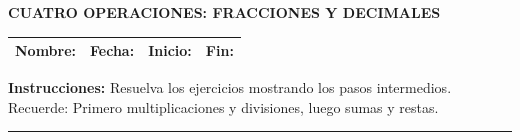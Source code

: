 \documentclass[11pt, letterpaper]{article}
\begin{document}
\begin{center}
	\textbf{\Large CUATRO OPERACIONES: FRACCIONES Y DECIMALES} \\
	\vspace{0.4cm}
	\begin{tabular}{|p{5cm}|p{3.5cm}|p{3cm}|p{3cm}|}
		\hline
		Nombre: & Fecha: & Inicio: & Fin: \\ \hline
	\end{tabular}
\end{center}

\vspace{0.3cm}
\noindent \textbf{Instrucciones:} Resuelva los ejercicios mostrando los pasos intermedios. Recuerde: Primero multiplicaciones y divisiones, luego sumas y restas.

\hrule
\vspace{0.5cm}

\end{document}
